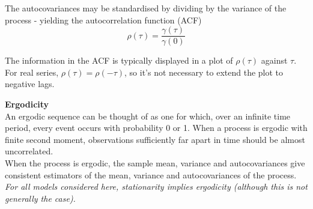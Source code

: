 \documentclass[DIV=14,titlepage=false]{scrreprt}
\begin{document}
\begin{definition}
    The autocovariances may be standardised by dividing by the variance of the process - yielding the autocorrelation function (ACF)\[ \rho(\tau) = \frac{\gamma(\tau)}{\gamma(0)} \]
\end{definition}
The information in the ACF is typically displayed in a plot of $\rho(\tau)$ against $\tau$. For real series, $\rho(\tau) = \rho(-\tau)$, so it's not necessary to extend the plot to negative lags.
\begin{note}
\textbf{Ergodicity}\\
An ergodic sequence can be thought of as one for which, over an infinite time period, every event occurs with probability 0 or 1. When a process is ergodic with finite second moment, observations sufficiently far apart in time should be almost uncorrelated.\\
When the process is ergodic, the sample mean, variance and autocovariances give consistent estimators of the mean, variance and autocovariances of the process.\\
\textit{For all models considered here, stationarity implies ergodicity (although this is not generally the case).}
\end{note}
\end{document}
